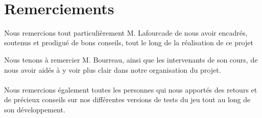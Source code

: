 \documentclass [a4 paper,11pt]{report}
\begin{document}
\newcommand{\HRule}{\rule{\linewidth}{0.5mm}}

\pagestyle{fancy}
\renewcommand\headrulewidth{1pt}
\fancyhead[L]{}
\fancyhead[R]{\leftmark}



\newpage 
~
\thispagestyle{empty}

\newpage

\thispagestyle{empty}
\section*{Remerciements}

Nous remercions tout particulièrement M. Lafourcade de nous avoir encadrés, soutenus et prodigué de bons conseils, tout le long de la réalisation de ce projet

Nous tenons à remercier M. Bourreau, ainsi que les intervenants de son cours, de nous avoir aidés à y voir plus clair dans notre organisation du projet.

\paragraph{}
Nous remercions également toutes les personnes qui nous apportés des retours et de précieux conseils sur nos différentes versions de tests du jeu tout au long de son développement.


\newpage

\setcounter{page}{1}
\tableofcontents

\newpage

\listoffigures

\newpage 



\newpage



\newpage




\newpage



\newpage



\newpage



\newpage


\end{document}
